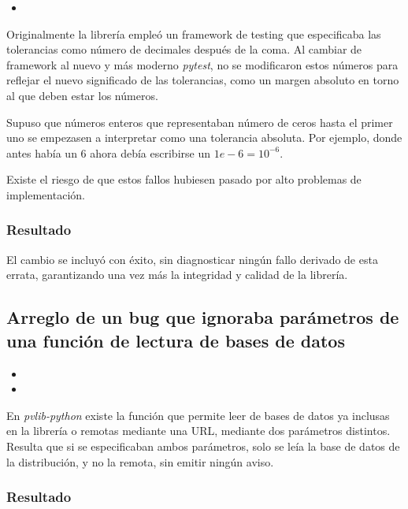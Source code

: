 \begin{itemize}
    \item {}
\end{itemize}

Originalmente la librería empleó un framework de testing que especificaba las tolerancias como número de decimales después de la coma. Al cambiar de framework al nuevo y más moderno \textit{pytest}, no se modificaron estos números para reflejar el nuevo significado de las tolerancias, como un margen absoluto en torno al que deben estar los números.

Supuso que números enteros que representaban número de ceros hasta el primer uno se empezasen a interpretar como una tolerancia absoluta. Por ejemplo, donde antes había un $6$ ahora debía escribirse un $1e-6 = 10^{-6}$.

Existe el riesgo de que estos fallos hubiesen pasado por alto problemas de implementación.

\subsubsection{Resultado}

El cambio se incluyó con éxito, sin diagnosticar ningún fallo derivado de esta errata, garantizando una vez más la integridad y calidad de la librería.

\subsection{Arreglo de un bug que ignoraba parámetros de una función de lectura de bases de datos}

\begin{itemize}
    \item {}
    \item {}
\end{itemize}

En \textit{pvlib-python} existe la función  que permite leer de bases de datos ya inclusas en la librería o remotas mediante una URL, mediante dos parámetros distintos. Resulta que si se especificaban ambos parámetros, solo se leía la base de datos de la distribución, y no la remota, sin emitir ningún aviso.

\subsubsection{Resultado}


